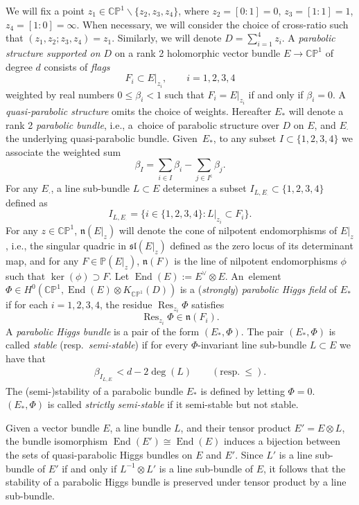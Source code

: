 \documentclass[pdftex]{sigma}
\newcommand{\field}[1]{\ensuremath{\mathbb{#1}}}
\newcommand{\CC}{\field{C}}
\newcommand{\PP}{\field{P}}
\newcommand{\qp}{\boldsymbol{\cdot}}
\DeclareMathOperator{\End}{End}
\DeclareMathOperator{\Res}{Res}
\numberwithin{equation}{section}
\begin{document}
We will fix a point $z_{1}\in\CC\PP^{1}\backslash\{z_{2},z_{3},z_{4}\}$, where $z_{2}=[0:1]=0$, $z_{3}=[1:1]=1$, $z_{4}=[1:0]=\infty$. When necessary, we will consider the choice of cross-ratio such that $(z_{1},z_{2};z_{3},z_{4})=z_{1}$. Similarly, we will denote $D = \sum_{i=1}^{4}z_{i}$. A \emph{parabolic structure supported on $D$} on a rank 2 holomorphic vector bundle $E\rightarrow \CC\PP^{1}$ of degree $d$ consists of \emph{flags}
\[
F_{i} \subset E|_{z_{i}},\qquad i=1,2,3, 4
\]
weighted by real numbers $0\leq \beta_{i}<1$ such that $F_{i} = E\vert_{z_{i}}$ if and only if $\beta_{i}=0$. A \emph{quasi-parabolic structure} omits the choice of weights. Hereafter $E_{*}$ will denote a rank 2 \emph{parabolic bundle}, i.e., a~choice of parabolic structure over $D$ on $E$, and $E_{\qp}$ the underlying quasi-parabolic bundle. Given~$E_{*}$, to any subset $I\subset\{1,2,3,4\}$ we associate the weighted sum
\[
\beta_{I} = \sum_{i\in I}\beta_{i} - \sum_{j\in I^{\mathsf{c}}}\beta_{j}.
\]
For any $E_{\qp}$, a line sub-bundle $L\subset E$ determines a subset $I_{L,E_{\qp}}\subset \{1,2,3,4\}$ defined as
\[
I_{L,E_{\qp}} = \bigl\{i\in\{1,2,3,4\}\colon L|_{z_{i}} \subset F_{i}\bigr\}.
\]
For any $z\in\CC\PP^{1}$, $\mathfrak{n}(E\vert_{z})$ will denote the cone of nilpotent endomorphisms of $E\vert_{z}$, i.e., the singular quadric in $\mathfrak{sl}(E|_{z})$ defined as the zero locus of its determinant map, and for any $F\in\PP(E\vert_{z})$, $\mathfrak{n}(F)$ is the line of nilpotent endomorphisms $\phi$ such that $\ker(\phi) \supset F$.
Let $\End (E):=E^{\vee}\otimes E$. An~element $\Phi\in H^{0}(\CC\PP^{1},\End (E)\otimes K_{\CC\PP^{1}}(D))$ is a (\textit{strongly}) \textit{parabolic Higgs field} of $E_{*}$ if for each $i=1,2,3,4$, the residue $\Res_{z_{i}}\Phi$ satisfies
\[
\Res_{z_{i}}\Phi\in\mathfrak{n}(F_{i}).
\]
A \emph{parabolic Higgs bundle} is a pair of the form $(E_{*},\Phi)$. The pair $(E_{*},\Phi)$ is called \emph{stable} (resp.~\textit{semi-stable}) if for every $\Phi$-invariant line sub-bundle $L\subset E$ we have that
\begin{gather}\label{eq:effective}
\beta_{I_{L,E_{\qp}}} < d - 2\deg(L)\qquad (\text{resp.}~\leq).
\end{gather}
The (semi-)stability of a parabolic bundle $E_{*}$ is defined by letting $\Phi= 0$. $(E_{*},\Phi)$ is called \textit{strictly semi-stable} if it semi-stable but not stable.

Given a vector bundle $E$, a line bundle $L$, and their tensor product $E' = E\otimes L$, the bundle isomorphism $\End(E')\cong \End (E)$ induces a bijection between the sets of quasi-parabolic Higgs bundles on $E$ and $E'$. Since $L'$ is a line sub-bundle of $E'$ if and only if $L^{-1}\otimes L'$ is a line sub-bundle of $E$, it follows that the stability of a parabolic Higgs bundle is preserved under tensor product by a line sub-bundle.
\end{document}
